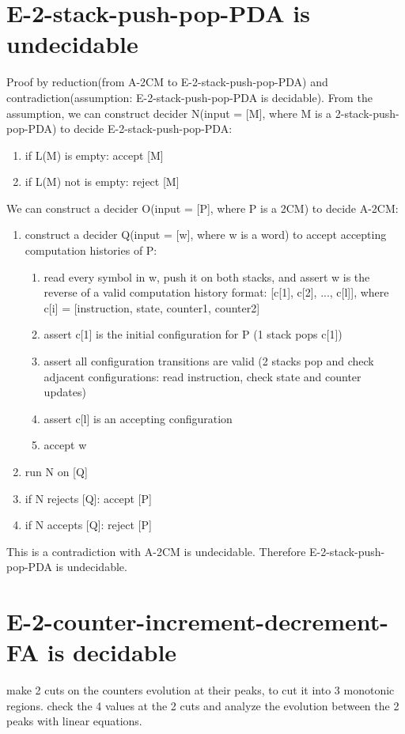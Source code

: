 \documentclass{article}
\begin{document}
\section{E-2-stack-push-pop-PDA is undecidable}
Proof by reduction(from A-2CM to E-2-stack-push-pop-PDA) and contradiction(assumption: E-2-stack-push-pop-PDA is decidable). From the assumption, we can construct decider N(input = [M], where M is a 2-stack-push-pop-PDA) to decide E-2-stack-push-pop-PDA:
\begin{enumerate}
	\item if L(M) is empty: accept [M]
	\item if L(M) not is empty: reject [M]
\end{enumerate}
We can construct a decider O(input = [P], where P is a 2CM) to decide A-2CM:
\begin{enumerate}
	\item construct a decider Q(input = [w], where w is a word) to accept accepting computation histories of P:
	\begin{enumerate}
		\item read every symbol in w, push it on both stacks, and assert w is the reverse of a valid computation history format: [c[1], c[2], ..., c[l]], where c[i] = [instruction, state, counter1, counter2]
		\item assert c[1] is the initial configuration for P (1 stack pops c[1])
		\item assert all configuration transitions are valid (2 stacks pop and check adjacent configurations: read instruction, check state and counter updates)
		\item assert c[l] is an accepting configuration
		\item accept w
	\end{enumerate}
	\item run N on [Q]
	\item if N rejects [Q]: accept [P]
	\item if N accepts [Q]: reject [P]
\end{enumerate}
This is a contradiction with A-2CM is undecidable. Therefore E-2-stack-push-pop-PDA is undecidable.

\section{E-2-counter-increment-decrement-FA is decidable}
make 2 cuts on the counters evolution at their peaks, to cut it into 3 monotonic regions. check the 4 values at the 2 cuts and analyze the evolution between the 2 peaks with linear equations.
\end{document}
